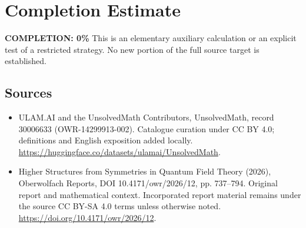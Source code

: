 \documentclass[11pt]{article}
\begin{document}
\section{Completion Estimate}
\noindent\textbf{COMPLETION: 0\%}
This is an elementary auxiliary calculation or an explicit test of a restricted strategy. No new portion of the full source target is established.

\subsection{Sources}
\begin{itemize}
\item[\hypertarget{source:30006633:1}{S1}] ULAM.AI and the UnsolvedMath Contributors, UnsolvedMath, record 30006633 (OWR-14299913-002). Catalogue curation under CC BY 4.0; definitions and English exposition added locally.
\url{https://huggingface.co/datasets/ulamai/UnsolvedMath}.
\item[\hypertarget{source:30006633:2}{S2}] Higher Structures from Symmetries in Quantum Field Theory (2026), Oberwolfach Reports, DOI 10.4171/owr/2026/12, pp. 737--794. Original report and mathematical context. Incorporated report material remains under the source CC BY-SA 4.0 terms unless otherwise noted.
\url{https://doi.org/10.4171/owr/2026/12}.
\end{itemize}
\label{end:30006633}
\end{document}
